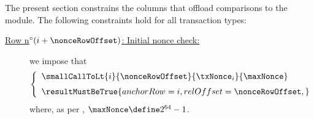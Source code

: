 \begin{center}
\end{center}
The present section constrains the columns that offload comparisons to the \wcpMod{} module.
The following constraints hold for all transaction types:
\begin{description}
	\item[\underline{\underline{Row n$^\circ(i + \nonceRowOffset)$: Initial nonce check:}}]
		we impose that
		\[
			\left\{\begin{array}{l}
				\smallCallToLt
				{i}{\nonceRowOffset}
				{\txNonce_{i}}
				{\maxNonce}
				\vspace{2mm}
				\\
                                \resultMustBeTrue {
                                        anchorRow = i               ,
                                        relOffset = \nonceRowOffset ,
                                }
				\\
			\end{array}\right.
		\]
		where, as per \cite{EIP-2681},
		$\maxNonce \define 2^{64} - 1$.


\end{description}
